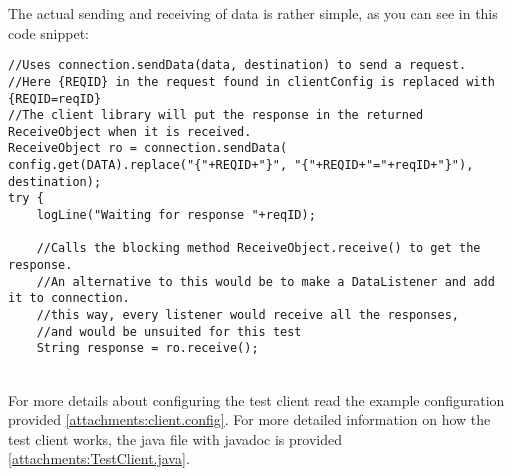     The actual sending and receiving of data is rather simple, as you can see in this code snippet:
    \lstset{language=Java, style=java}
    \lstset{frame=single}
    \lstset{breaklines=true}
    \begin{lstlisting}
//Uses connection.sendData(data, destination) to send a request.
//Here {REQID} in the request found in clientConfig is replaced with {REQID=reqID}
//The client library will put the response in the returned ReceiveObject when it is received.
ReceiveObject ro = connection.sendData(
config.get(DATA).replace("{"+REQID+"}", "{"+REQID+"="+reqID+"}"), destination);
try {
    logLine("Waiting for response "+reqID);

    //Calls the blocking method ReceiveObject.receive() to get the response.
    //An alternative to this would be to make a DataListener and add it to connection.
    //this way, every listener would receive all the responses,
    //and would be unsuited for this test
    String response = ro.receive();
    \end{lstlisting}
    \\
    For more details about configuring the test client read the example configuration provided \ref{attachments:client.config}. For more detailed information on how the test client works, the java file with javadoc is provided \ref{attachments:TestClient.java}.
